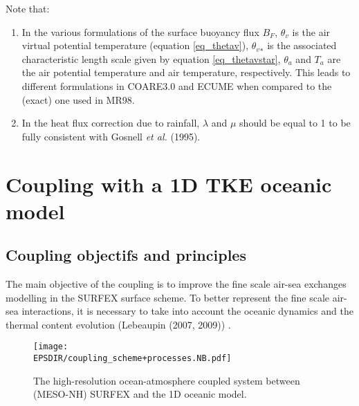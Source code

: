 Note that:
\begin{enumerate}
	\item In the various formulations of the surface buoyancy flux $B_F$, ${\theta}_v$ is the air virtual potential temperature
(equation \ref{eq_thetav}), ${{\theta}_v}_{*}$ is the associated characteristic length scale given by equation \ref{eq_thetavstar}, 
${\theta}_a$ and $T_a$ are the air potential temperature and air temperature, respectively. 
This leads to different formulations in COARE3.0 and ECUME when compared to the (exact) one used in MR98.
	\item In the heat flux correction due to rainfall, $\lambda$ and $\mu$ should be equal to 1 to be fully consistent with 
Gosnell \textit{et al.} (1995). %
\end{enumerate}


\newpage
\section{Coupling with a 1D TKE oceanic model}
\subsection{Coupling objectifs and principles}
The main objective of the coupling is to improve the fine scale air-sea exchanges modelling in the SURFEX surface scheme. To better represent the fine scale air-sea interactions, it is necessary to take into account the oceanic dynamics and the thermal content evolution (Lebeaupin \etal (2007, 2009)) %
. \\
\begin{figure}[!b]
\texttt{[image: \\EPSDIR/coupling\_scheme+processes.NB.pdf]}
\vspace{-0.75cm}
\caption{The high-resolution ocean-atmosphere coupled system between (MESO-NH) SURFEX and the 1D oceanic model. \label{scheme_coupled_syst}}
\end{figure}
 
